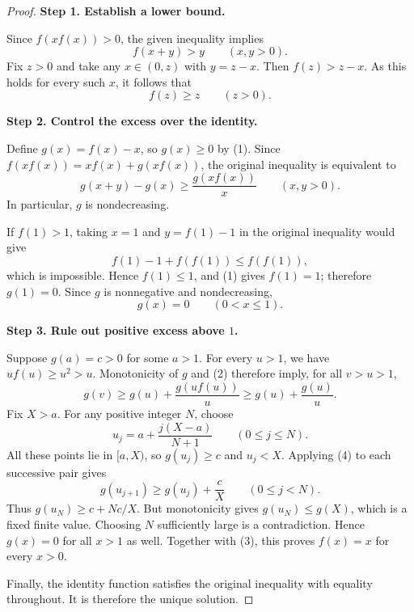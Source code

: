 
\begin{dlsummary}[title={\bfseries Solution 19. The Reciprocal-Slope Pinch},breakable]

\begin{proof}
\textbf{Step 1. Establish a lower bound.}

Since $f(xf(x))>0$, the given inequality implies
\[
f(x+y)>y\qquad(x,y>0).
\]
Fix $z>0$ and take any $x\in(0,z)$ with $y=z-x$. Then
$f(z)>z-x$. As this holds for every such $x$, it follows that
\[
f(z)\geq z\qquad(z>0). \tag{1}
\]

\medskip
\noindent
\textbf{Step 2. Control the excess over the identity.}

Define $g(x)=f(x)-x$, so $g(x)\geq0$ by (1). Since
$f(xf(x))=xf(x)+g(xf(x))$, the original inequality is equivalent to
\[
g(x+y)-g(x)\geq\frac{g(xf(x))}{x}\qquad(x,y>0). \tag{2}
\]
In particular, $g$ is nondecreasing.

If $f(1)>1$, taking $x=1$ and $y=f(1)-1$ in the original inequality
would give
\[
f(1)-1+f(f(1))\leq f(f(1)),
\]
which is impossible. Hence $f(1)\leq1$, and (1) gives $f(1)=1$;
therefore $g(1)=0$. Since $g$ is nonnegative and nondecreasing,
\[
g(x)=0\qquad(0<x\leq1). \tag{3}
\]

\medskip
\noindent
\textbf{Step 3. Rule out positive excess above $1$.}

Suppose $g(a)=c>0$ for some $a>1$. For every $u>1$, we have
$uf(u)\geq u^2>u$. Monotonicity of $g$ and (2) therefore imply, for
all $v>u>1$,
\[
g(v)\geq g(u)+\frac{g(uf(u))}{u}
\geq g(u)+\frac{g(u)}{u}. \tag{4}
\]
Fix $X>a$. For any positive integer $N$, choose
\[
u_j=a+\frac{j(X-a)}{N+1}\qquad(0\leq j\leq N).
\]
All these points lie in $[a,X)$, so $g(u_j)\geq c$ and
$u_j<X$. Applying (4) to each successive pair gives
\[
g(u_{j+1})\geq g(u_j)+\frac{c}{X}
\qquad(0\leq j<N).
\]
Thus $g(u_N)\geq c+Nc/X$. But monotonicity gives $g(u_N)\leq g(X)$,
which is a fixed finite value. Choosing $N$ sufficiently large is a
contradiction. Hence $g(x)=0$ for all $x>1$ as well. Together with (3),
this proves $f(x)=x$ for every $x>0$.

Finally, the identity function satisfies the original inequality with
equality throughout. It is therefore the unique solution.
\end{proof}

\end{dlsummary}